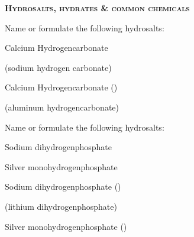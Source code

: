 \documentclass[main.tex]{subfiles}
\begin{document}
\begin{multicols*}{2}
{\raggedright\textsc{\textbf{ Hydrosalts, hydrates  \& common chemicals}}\par}

\begin{question}[ID=\the\value{numA}]
Name or formulate the following hydrosalts:
\begin{inparaenum}[(a)]	
\item {}				%
\item Calcium Hydrogencarbonate 	%
\item {}				%
\end{inparaenum}
\end{question}
\begin{solution}
\begin{inparaenum}[(a)]
\item {}				 (sodium hydrogen carbonate)	
\item Calcium Hydrogencarbonate 	 ()
\item {}				 (aluminum hydrogencarbonate)
 \end{inparaenum}\hspace{0.1cm}\end{solution}
\begin{question}[ID=\the\value{numA}]
Name or formulate the following hydrosalts:
\begin{inparaenum}[(a)]	
\item Sodium dihydrogenphosphate	%
\item {}				%
\item Silver monohydrogenphosphate	%
\end{inparaenum}
\end{question}
\begin{solution}
\begin{inparaenum}[(a)]
\item Sodium dihydrogenphosphate	 ()
\item {}				 (lithium dihydrogenphosphate)
\item Silver monohydrogenphosphate	 ()
 \end{inparaenum}\hspace{0.1cm}\end{solution}


\end{multicols*}
\end{document}
